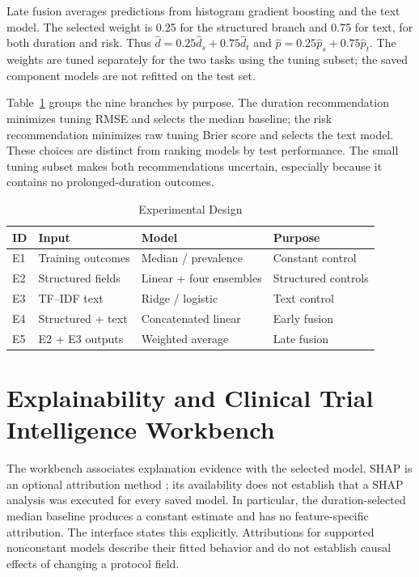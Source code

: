 \documentclass[10pt,letterpaper,twocolumn]{article}
\begin{document}
Late fusion averages predictions from histogram gradient boosting and the text model. The selected weight is 0.25 for the structured branch and 0.75 for text, for both duration and risk. Thus $\hat d=0.25\hat d_s+0.75\hat d_t$ and $\hat p=0.25\hat p_s+0.75\hat p_t$. The weights are tuned separately for the two tasks using the tuning subset; the saved component models are not refitted on the test set.

Table~\ref{tab:experiments} groups the nine branches by purpose. The duration recommendation minimizes tuning RMSE and selects the median baseline; the risk recommendation minimizes raw tuning Brier score and selects the text model. These choices are distinct from ranking models by test performance. The small tuning subset makes both recommendations uncertain, especially because it contains no prolonged-duration outcomes.

\begin{table}[!t]
\caption{Experimental Design}
\label{tab:experiments}
\centering
\footnotesize
\setlength{\tabcolsep}{3pt}
\renewcommand{\arraystretch}{1.25}
\begin{tabular}{|p{}|p{}|p{}|p{}|}
\hline
\textbf{ID} & \textbf{Input} & \textbf{Model} & \textbf{Purpose} \\
\hline
E1 & Training outcomes & Median / prevalence & Constant control \\
\hline
E2 & Structured fields & Linear + four ensembles & Structured controls \\
\hline
E3 & TF--IDF text & Ridge / logistic & Text control \\
\hline
E4 & Structured + text & Concatenated linear & Early fusion \\
\hline
E5 & E2 + E3 outputs & Weighted average & Late fusion \\
\hline
\end{tabular}
\end{table}

\section{Explainability and Clinical Trial Intelligence Workbench}

The workbench associates explanation evidence with the selected model. SHAP is an optional attribution method \cite{shap}; its availability does not establish that a SHAP analysis was executed for every saved model. In particular, the duration-selected median baseline produces a constant estimate and has no feature-specific attribution. The interface states this explicitly. Attributions for supported nonconstant models describe their fitted behavior and do not establish causal effects of changing a protocol field.
\end{document}
